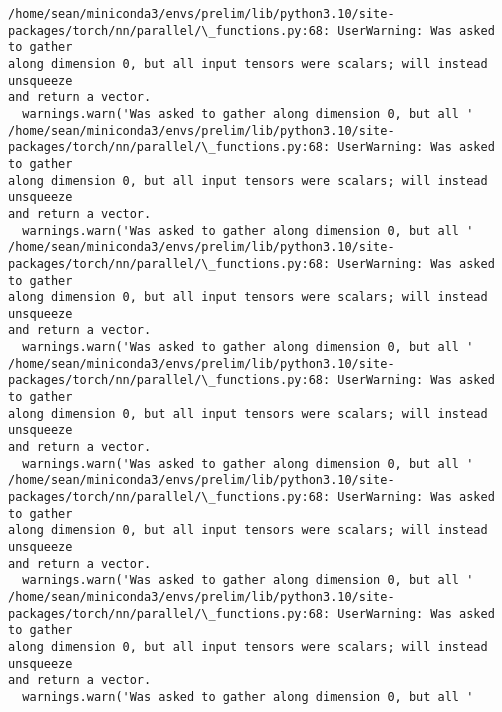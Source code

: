 \documentclass[11pt]{article}
\begin{document}
    \begin{Verbatim}[commandchars=\\\{\}]
/home/sean/miniconda3/envs/prelim/lib/python3.10/site-
packages/torch/nn/parallel/\_functions.py:68: UserWarning: Was asked to gather
along dimension 0, but all input tensors were scalars; will instead unsqueeze
and return a vector.
  warnings.warn('Was asked to gather along dimension 0, but all '
/home/sean/miniconda3/envs/prelim/lib/python3.10/site-
packages/torch/nn/parallel/\_functions.py:68: UserWarning: Was asked to gather
along dimension 0, but all input tensors were scalars; will instead unsqueeze
and return a vector.
  warnings.warn('Was asked to gather along dimension 0, but all '
/home/sean/miniconda3/envs/prelim/lib/python3.10/site-
packages/torch/nn/parallel/\_functions.py:68: UserWarning: Was asked to gather
along dimension 0, but all input tensors were scalars; will instead unsqueeze
and return a vector.
  warnings.warn('Was asked to gather along dimension 0, but all '
/home/sean/miniconda3/envs/prelim/lib/python3.10/site-
packages/torch/nn/parallel/\_functions.py:68: UserWarning: Was asked to gather
along dimension 0, but all input tensors were scalars; will instead unsqueeze
and return a vector.
  warnings.warn('Was asked to gather along dimension 0, but all '
/home/sean/miniconda3/envs/prelim/lib/python3.10/site-
packages/torch/nn/parallel/\_functions.py:68: UserWarning: Was asked to gather
along dimension 0, but all input tensors were scalars; will instead unsqueeze
and return a vector.
  warnings.warn('Was asked to gather along dimension 0, but all '
/home/sean/miniconda3/envs/prelim/lib/python3.10/site-
packages/torch/nn/parallel/\_functions.py:68: UserWarning: Was asked to gather
along dimension 0, but all input tensors were scalars; will instead unsqueeze
and return a vector.
  warnings.warn('Was asked to gather along dimension 0, but all '
    \end{Verbatim}
\end{document}
